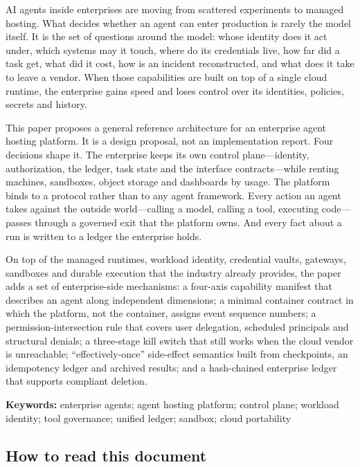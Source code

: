 AI agents inside enterprises are moving from scattered experiments to managed hosting. What decides whether an agent can enter production is rarely the model itself. It is the set of questions around the model: whose identity does it act under, which systems may it touch, where do its credentials live, how far did a task get, what did it cost, how is an incident reconstructed, and what does it take to leave a vendor. When those capabilities are built on top of a single cloud runtime, the enterprise gains speed and loses control over its identities, policies, secrets and history.

This paper proposes a general reference architecture for an enterprise agent hosting platform. It is a design proposal, not an implementation report. Four decisions shape it. The enterprise keeps its own control plane---identity, authorization, the ledger, task state and the interface contracts---while renting machines, sandboxes, object storage and dashboards by usage. The platform binds to a protocol rather than to any agent framework. Every action an agent takes against the outside world---calling a model, calling a tool, executing code---passes through a governed exit that the platform owns. And every fact about a run is written to a ledger the enterprise holds.

On top of the managed runtimes, workload identity, credential vaults, gateways, sandboxes and durable execution that the industry already provides, the paper adds a set of enterprise-side mechanisms: a four-axis capability manifest that describes an agent along independent dimensions; a minimal container contract in which the platform, not the container, assigns event sequence numbers; a permission-intersection rule that covers user delegation, scheduled principals and structural denials; a three-stage kill switch that still works when the cloud vendor is unreachable; ``effectively-once'' side-effect semantics built from checkpoints, an idempotency ledger and archived results; and a hash-chained enterprise ledger that supports compliant deletion.

{\small\sffamily\color{Muted}
  \textbf{\color{Ink}Keywords:} enterprise agents; agent hosting platform; control plane; workload identity;
  tool governance; unified ledger; sandbox; cloud portability\par}

\subsection*{How to read this document}

